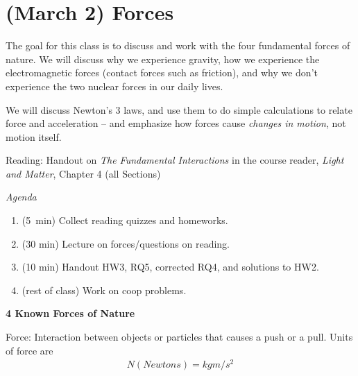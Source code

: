 \documentclass[12pt]{article}
\begin{document}
\begin{center}\end{center}

\clearpage
\section{(March 2) \textbf{Forces}}

The goal for this class is to discuss and work with the four fundamental forces of nature. We will discuss why we experience gravity, how we experience the electromagnetic forces (contact forces such as friction), and why we don't experience the two nuclear forces in our daily lives.

We will discuss Newton's 3 laws, and use them to do simple calculations to relate force and acceleration -- and emphasize how forces cause \textit{changes in motion}, not motion itself.

Reading: Handout on \textit{The Fundamental Interactions} in the course reader, \textit{Light and Matter}, Chapter 4 (all Sections)

\noindent
\textit{Agenda}
\begin{enumerate}
	\item (5~min) Collect reading quizzes and homeworks.
	\item (30 min) Lecture on forces/questions on reading.
	\item (10 min) Handout HW3, RQ5, corrected RQ4, and solutions to HW2.
	\item (rest of class) Work on coop problems.
\end{enumerate}

\noindent\textbf{\large 4 Known Forces of Nature}

Force: Interaction between objects or particles that causes a push or a pull.
Units of force are
\begin{eqnarray}
N (Newtons) = kg m/s^2 \nonumber
\end{eqnarray}
\end{document}
